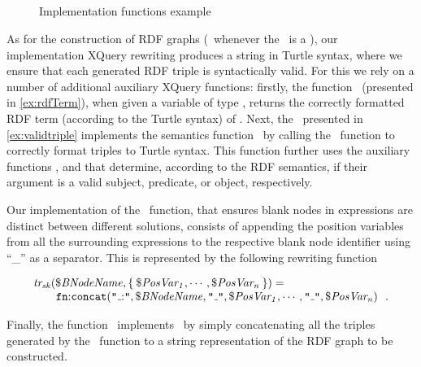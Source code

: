 \subsection{\ConstructClause}
\label{sec:constructclause}
%
\begin{figure}[t]
  \caption{Implementation functions example}
\end{figure}
%
As for the construction of \ac{RDF} graphs (\ie~whenever the~ is a \ConstructClause), our
implementation XQuery rewriting produces a string in Turtle syntax, where we ensure that each generated RDF triple is
syntactically valid.
%
For this we rely on a number of additional auxiliary XQuery functions: firstly, the
function~ (presented in \cref{ex:rdfTerm}), when given a variable of type
, returns the correctly formatted \ac{RDF} term (according to the Turtle syntax) of .
%
Next, the~ presented in \cref{ex:validtriple} implements the semantics
function~ by calling the~ function to correctly format triples to Turtle
syntax. 
%
This function further uses the auxiliary functions ,  and
 that determine, according to the \ac{RDF} semantics, if their argument is a valid subject,
predicate, or object, respectively.


Our implementation of the~ function, that ensures blank nodes in \CONSTRUCT expressions
are distinct between different solutions, consists of appending the position variables from all the surrounding \FOR
expressions to the respective blank node identifier using ``\_'' as a separator.  This is represented by the following
rewriting function
%
\begin{small}
\begin{equation*}
\begin{array}{l}
  \funcCall{tr_{sk}}{\var{BNodeName},\set{\var{PosVar_1}, \cdots,\var{PosVar_n}}} = \\
  \qquad\funcCall{\concat}{
    \texttt{"}\mathunderscore{:}\texttt{"},\var{BNodeName},\texttt{"}\mathunderscore\texttt{"},\var{PosVar_1}, \cdots, \texttt{"}\mathunderscore\texttt{"}, \var{PosVar_n} 
  } \enspace .
\end{array} 
\end{equation*}
\end{small}%
%
Finally, the function~ implements~ by simply concatenating all the triples
generated by the~ function to a string representation of the RDF graph to be constructed.



